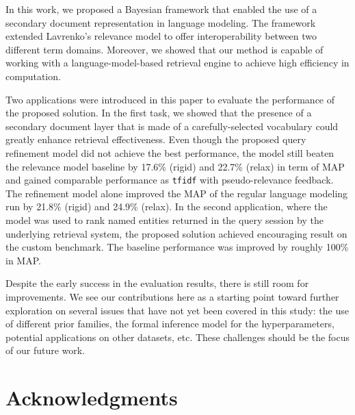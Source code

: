 In this work, we proposed a Bayesian framework that enabled the use of a
secondary document representation in language modeling.  The framework extended
Lavrenko's relevance model to offer interoperability between two different
term domains.  Moreover, we showed that our method is capable of working with a
language-model-based retrieval engine to achieve high efficiency in
computation.  

Two applications were introduced in this paper to evaluate the performance of
the proposed solution.  In the first task, we showed that the presence of a
secondary document layer that is made of a carefully-selected vocabulary could
greatly enhance retrieval effectiveness.  Even though the proposed query
refinement model did not achieve the best performance, the model still beaten
the relevance model baseline by 17.6\% (rigid) and 22.7\% (relax) in term of
MAP and gained comparable performance as {\tt tfidf} with pseudo-relevance
feedback.  The refinement model alone improved the MAP of the regular language
modeling run by 21.8\% (rigid) and 24.9\% (relax).  In the second application,
where the model was used to rank named entities returned in the query session
by the underlying retrieval system, the proposed solution achieved encouraging
result on the custom benchmark.  The baseline performance was improved by
roughly 100\% in MAP.  

Despite the early success in the evaluation results, there is still room for
improvements.  We see our contributions here as a starting point toward further
exploration on several issues that have not yet been covered in this study: the
use of different prior families, the formal inference model for the
hyperparameters, potential applications on other datasets, etc.  These
challenges should be the focus of our future work.


\section*{Acknowledgments}

